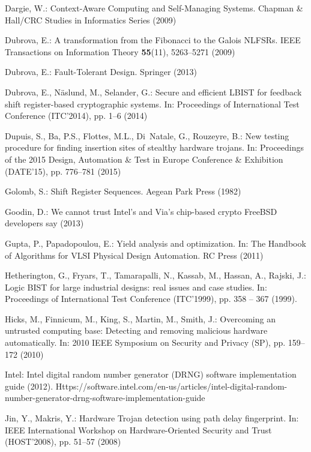 \documentclass[a4paper]{llncs}
\begin{document}
\begin{thebibliography}{10}
Dargie, W.: Context-Aware Computing and Self-Managing Systems.
\newblock Chapman \& Hall/CRC Studies in Informatics Series (2009)

Dubrova, E.: A transformation from the {F}ibonacci to the {G}alois {NLFSR}s.
\newblock IEEE Transactions on Information Theory \textbf{55}(11), 5263--5271
  (2009)

Dubrova, E.: Fault-Tolerant Design.
\newblock Springer (2013)

Dubrova, E., N\"aslund, M., Selander, G.: Secure and efficient {LBIST} for
  feedback shift register-based cryptographic systems.
\newblock In: Proceedings of International Test Conference (ITC'2014), pp. 1--6
  (2014)

Dupuis, S., Ba, P.S., Flottes, M.L., Di~Natale, G., Rouzeyre, B.: New testing
  procedure for finding insertion sites of stealthy hardware trojans.
\newblock In: Proceedings of the 2015 Design, Automation \& Test in Europe
  Conference \& Exhibition (DATE'15), pp. 776--781 (2015)

Golomb, S.: Shift Register Sequences.
\newblock Aegean Park Press (1982)

Goodin, D.: We cannot trust {I}ntel's and {V}ia's chip-based crypto {FreeBSD}
  developers say (2013)

Gupta, P., Papadopoulou, E.: Yield analysis and optimization.
\newblock In: The Handbook of Algorithms for VLSI Physical Design Automation.
  RC Press (2011)

Hetherington, G., Fryars, T., Tamarapalli, N., Kassab, M., Hassan, A., Rajski,
  J.: Logic {BIST} for large industrial designs: real issues and case studies.
\newblock In: Proceedings of International Test Conference (ITC'1999), pp. 358
  -- 367 (1999).
\newblock {}

Hicks, M., Finnicum, M., King, S., Martin, M., Smith, J.: Overcoming an
  untrusted computing base: Detecting and removing malicious hardware
  automatically.
\newblock In: 2010 IEEE Symposium on Security and Privacy (SP), pp. 159--172
  (2010)

{Intel}: Intel digital random number generator ({DRNG}) software implementation
  guide (2012).
\newblock
  Https://software.intel.com/en-us/articles/intel-digital-random-number-generator-drng-software-implementation-guide

Jin, Y., Makris, Y.: Hardware {T}rojan detection using path delay fingerprint.
\newblock In: IEEE International Workshop on Hardware-Oriented Security and
  Trust (HOST'2008), pp. 51--57 (2008)


\end{thebibliography}
\end{document}
